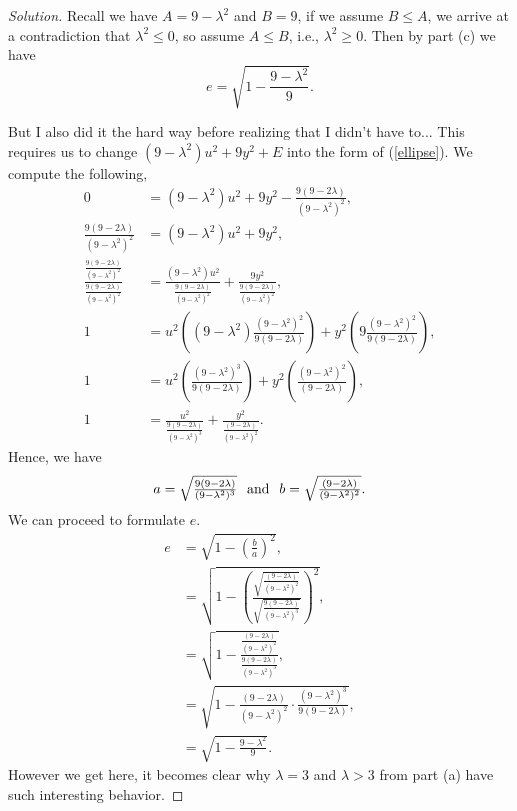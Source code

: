 \documentclass[letterpaper, 12pt]{amsart}
\theoremstyle{definition}  							%
\begin{document}
		\begin{proof}[Solution]
		Recall we have $A = 9 - \lambda^2$ and $B = 9$, if we assume $B \leq A$, we arrive at a contradiction that $\lambda^2 \leq 0$, so assume $A \leq B$, i.e., $\lambda^2 \geq 0$.
		Then by part (c) we have $$e = \sqrt{1 - \frac{9 - \lambda^2}{9}}.$$
			
		But I also did it the hard way before realizing that I didn't have to...
		This requires us to change $\left( 9 - \lambda^2 \right)u^{2} + 9y^2 + E$ into the form of (\ref{ellipse}).
		We compute the following,
			\begin{align*}
				0 &= \left( 9 - \lambda^2 \right)u^{2} + 9y^2 - \tfrac{9(9 - 2\lambda)}{(9 - \lambda^2)^2}, \\
				\tfrac{9(9 - 2\lambda)}{(9 - \lambda^2)^2} &= \left( 9 - \lambda^2 \right)u^{2} + 9y^2, \\
				\frac{\tfrac{9(9 - 2\lambda)}{(9 - \lambda^2)^2}}{\tfrac{9(9 - 2\lambda)}{(9 - \lambda^2)^2}} &= \frac{\left( 9 - \lambda^2 \right)u^{2}}{\tfrac{9(9 - 2\lambda)}{(9 - \lambda^2)^2}} + \frac{9y^2}{\tfrac{9(9 - 2\lambda)}{(9 - \lambda^2)^2}}, \\
				1 &= u^{2} \left( (9 - \lambda^2) \frac{(9 - \lambda^2)^2}{9(9 - 2\lambda)} \right) + y^{2}\left( 9 \frac{(9 - \lambda^2)^2}{9(9 - 2\lambda)} \right), \\
				1 &= u^{2} \left( \frac{(9 - \lambda^2)^3}{9(9 - 2\lambda)} \right) + y^{2}\left( \frac{(9 - \lambda^2)^2}{(9 - 2\lambda)} \right), \\
				1 &= \frac{u^{2}}{\tfrac{{9(9 - 2\lambda)}}{{(9 - \lambda^2)^3}}} + \frac{y^{2}}{\tfrac{{(9 - 2\lambda)}}{{(9 - \lambda^2)^2}}}.
			\end{align*}
		Hence, we have $$a = \sqrt{\tfrac{{9(9 - 2\lambda)}}{{(9 - \lambda^2)^3}}} \hspace{2.5mm} \text{and} \hspace{2.5mm} b = \sqrt{\tfrac{{(9 - 2\lambda)}}{{(9 - \lambda^2)^2}}}.$$
		We can proceed to formulate $e$.
			\begin{align*}
				e &= \sqrt{1 - \left(\frac{b}{a}\right)^2}, \\
				&= \sqrt{1 - \left( \frac{\sqrt{\tfrac{{(9 - 2\lambda)}}{{(9 - \lambda^2)^2}}}}{\sqrt{\tfrac{{9(9 - 2\lambda)}}{{(9 - \lambda^2)^3}}}} \right)^2}, \\
				&= \sqrt{1 - \frac{\tfrac{{(9 - 2\lambda)}}{{(9 - \lambda^2)^2}}}{\tfrac{{9(9 - 2\lambda)}}{{(9 - \lambda^2)^3}}} }, \\
				&= \sqrt{1 - \frac{{(9 - 2\lambda)}}{{(9 - \lambda^2)^2}} \cdot \frac{{(9 - \lambda^2)^3}}{{9(9 - 2\lambda)}}}, \\
				&= \sqrt{1 - \frac{9 - \lambda^2}{9}}.
			\end{align*}
		However we get here, it becomes clear why $\lambda = 3$ and $\lambda > 3$ from part (a) have such interesting behavior.			
		\end{proof}
		\newpage
\end{document}
